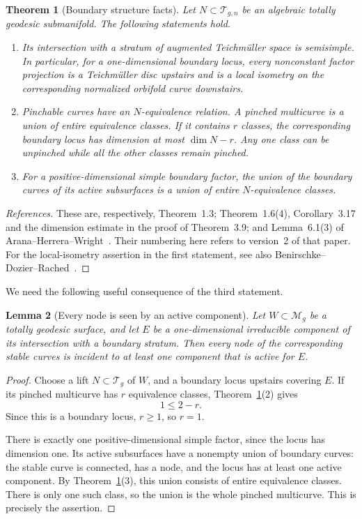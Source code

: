 \documentclass[11pt]{article}
\newcommand{\M}{\mathcal M}
\newcommand{\T}{\mathcal T}
\newtheorem{theorem}{Theorem}[section]
\newtheorem{lemma}[theorem]{Lemma}
\theoremstyle{remark}
\begin{document}
\begin{theorem}[Boundary structure facts]\label{thm:structure}
Let \(N\subset\T_{g,n}\) be an algebraic totally geodesic submanifold.
The following statements hold.
\begin{enumerate}
\item
Its intersection with a stratum of augmented Teichm\"uller space
is semisimple. In particular, for a one-dimensional boundary
locus, every nonconstant factor projection is a Teichm\"uller
disc upstairs and is a local isometry on the corresponding
normalized orbifold curve downstairs.

\item
Pinchable curves have an \(N\)-equivalence relation. A pinched
multicurve is a union of entire equivalence classes. If it
contains \(r\) classes, the corresponding boundary locus has
dimension at most \(\dim N-r\). Any one class can be unpinched
while all the other classes remain pinched.

\item
For a positive-dimensional simple boundary factor, the union of
the boundary curves of its active subsurfaces is a union of
entire \(N\)-equivalence classes.
\end{enumerate}
\end{theorem}

\begin{proof}[References]
These are, respectively, Theorem~1.3; Theorem~1.6(4),
Corollary~3.17 and the dimension estimate in the proof of
Theorem~3.9; and Lemma~6.1(3) of
Arana--Herrera--Wright~\cite{AHW}. Their numbering here refers
to version~2 of that paper.
For the local-isometry assertion in the first statement, see also
Benirschke--Dozier--Rached~\cite[Theorem~1.7 and
Proposition~9.2]{BDR}.
\end{proof}


We need the following useful consequence of the third statement.

\begin{lemma}[Every node is seen by an active component]\label{lem:active}
Let \(W\subset\M_g\) be a totally geodesic surface, and let \(E\)
be a one-dimensional irreducible component of its intersection
with a boundary stratum. Then every node of the corresponding
stable curves is incident to at least one component that is
active for \(E\).
\end{lemma}

\begin{proof}
Choose a lift \(N\subset\T_g\) of \(W\), and a boundary locus
upstairs covering \(E\). If its pinched multicurve has \(r\)
equivalence classes, Theorem~\ref{thm:structure}(2) gives
\[
1\leq 2-r.
\]
Since this is a boundary locus, \(r\geq1\), so \(r=1\).

There is exactly one positive-dimensional simple factor, since
the locus has dimension one. Its active subsurfaces have a
nonempty union of boundary curves: the stable curve is connected,
has a node, and the locus has at least one active component.
By Theorem~\ref{thm:structure}(3), this union consists of entire
equivalence classes. There is only one such class, so the union
is the whole pinched multicurve. This is precisely the assertion.
\end{proof}
\end{document}
